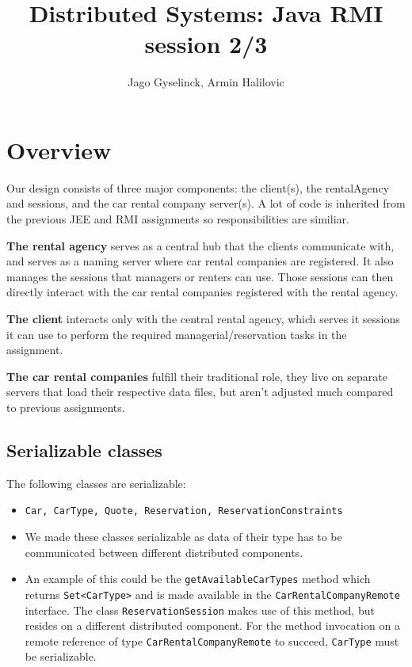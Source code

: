 \documentclass{scrartcl}
\title{Distributed Systems: Java RMI session 2/3}
\author{Jago Gyselinck, Armin Halilovic}
\begin{document}
	\maketitle

	\section{Overview}
	Our design consists of three major components: the client(s), the rentalAgency and sessions, and the car rental
	company server(s). A lot of code is inherited from the previous JEE and RMI assignments so responsibilities are similiar.
	
	\textbf{The rental agency} serves as a central hub that the clients communicate with, and serves as a naming server
	        where car rental companies are registered. It also manages the sessions that managers or renters can use.
	        Those sessions can then directly interact with the car rental companies registered with the rental agency.

	\textbf{The client} interacts only with the central rental agency, which serves it sessions it can use to perform
	        the required managerial/reservation tasks in the assignment.

    \textbf{The car rental companies} fulfill their traditional role, they live on separate servers that load their
            respective data files, but aren't adjusted much compared to previous assignments.

    \subsection{Serializable classes}
    The following classes are serializable: 
    \begin{itemize}
		\item \texttt{Car, CarType, Quote, Reservation, ReservationConstraints}
		\item We made these classes serializable as data of their type has to be
		      communicated between different distributed components.
		\item An example of this could be the \texttt{getAvailableCarTypes} method which
		      returns \texttt{Set<CarType>} and is made available in the \texttt{CarRentalCompanyRemote} interface.
		      The class \texttt{ReservationSession} makes use of this method, but resides on a different distributed component.
		      For the method invocation on a remote reference of type \texttt{CarRentalCompanyRemote} to succeed, \texttt{CarType} must be serializable.
	\end{itemize}
\end{document}
